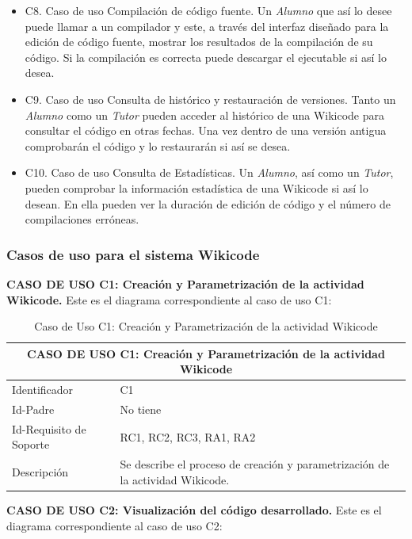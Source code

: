\begin{itemize}
	\item C8. Caso de uso Compilación de código fuente. Un \emph{Alumno} que así lo desee puede llamar a un compilador y este, a través del interfaz diseñado para la edición de código fuente, mostrar los resultados de la compilación de su código. Si la compilación es correcta puede descargar el ejecutable si así lo desea.
	\item C9. Caso de uso Consulta de histórico y restauración de versiones. Tanto un \emph{Alumno} como un \emph{Tutor} pueden acceder al histórico de una Wikicode para consultar el código en otras fechas. Una vez dentro de una versión antigua comprobarán el código y lo restaurarán si así se desea.
	\item C10. Caso de uso Consulta de Estadísticas. Un \emph{Alumno}, así como un \emph{Tutor}, pueden comprobar la información estadística de una Wikicode si así lo desean. En ella pueden ver la duración de edición de código y el número de compilaciones erróneas.
\end{itemize}

\subsubsection{Casos de uso para el sistema Wikicode}

\textbf{CASO DE USO C1: Creación y Parametrización de la actividad Wikicode.} Este es el diagrama correspondiente al caso de uso C1:

\begin{table}[h]
\centering
\begin{tabular}{ | p{} | p{} | }
	\hline
	\multicolumn{2}{|c|}{CASO DE USO C1: Creación y Parametrización de la actividad Wikicode} \\
	\hline
	Identificador  & C1 \\
	\hline 
	Id-Padre & No tiene \\
	\hline
	Id-Requisito de Soporte & RC1, RC2, RC3, RA1, RA2 \\
	\hline
	Descripción & Se describe el proceso de creación y parametrización de la actividad Wikicode. \\
	\hline
\end{tabular}
\caption{Caso de Uso C1: Creación y Parametrización de la actividad Wikicode}
\end{table}

\vspace{2cm}

\textbf{CASO DE USO C2: Visualización del código desarrollado.} Este es el diagrama correspondiente al caso de uso C2:

